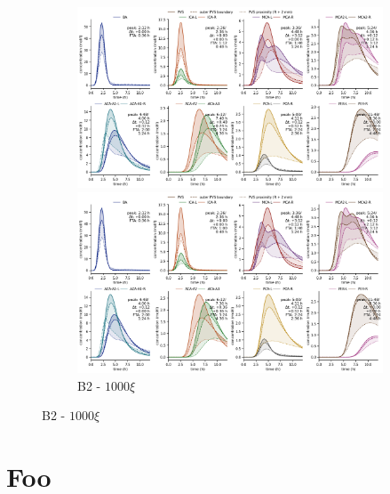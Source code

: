 \begin{figure}
\begin{subfigure}{0.5 \linewidth}
    \caption{B2 - $10 \xi$}
    \includegraphics[width=1\linewidth]{figures/modelB2-100_conc_at_label.png}
    \caption{B2 - $100 \xi$}
    \includegraphics[width=1\linewidth]{figures/modelB2-1000_conc_at_label.png}
    \caption{B2 - $1000 \xi$}
\end{subfigure}
    \label{fig:modelB_xi_variations}
\end{figure}



\section{Foo}

